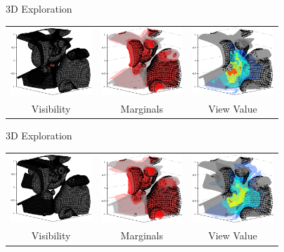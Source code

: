 \addtocounter{framenumber}{-1}
\begin{tframe}{3D Exploration}
\begin{center}

\bigskip
\begin{tabular}{ccc}
\includegraphics[width=1.2in]{media_exploration/view_02}&
\includegraphics[width=1.2in]{media_exploration/marginal_02}&
\includegraphics[width=1.2in]{media_exploration/energy_02}
\\ Visibility & Marginals & View Value
\end{tabular}
\end{center}
\end{tframe}

\addtocounter{framenumber}{-1}
\begin{tframe}{3D Exploration}
\begin{center}

\bigskip
\begin{tabular}{ccc}
\includegraphics[width=1.2in]{media_exploration/view_03}&
\includegraphics[width=1.2in]{media_exploration/marginal_03}&
\includegraphics[width=1.2in]{media_exploration/energy_03}
\\ Visibility & Marginals & View Value
\end{tabular}
\end{center}
\end{tframe}

